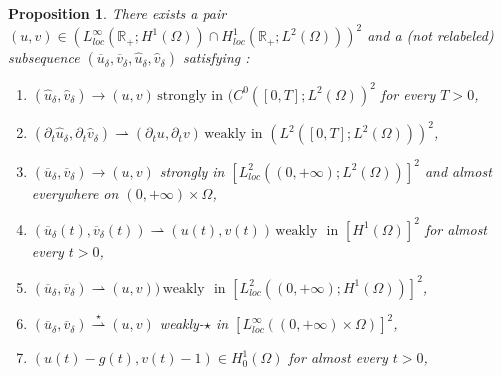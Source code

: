 \documentclass[reqno,12pt,twoside]{amsart}
\newtheorem{proposition}{Proposition}[section]
\numberwithin{equation}{section} \numberwithin{theorem}{section}
\numberwithin{proposition}{section} \numberwithin{lemma}{section}
\numberwithin{corollary}{section}
\numberwithin{definition}{section} \numberwithin{remark}{section}
\begin{document}
\begin{proposition}\label{extraction}
There exists a pair $(u,v) \in \left(L_{loc}^\infty(\mathbb{R}_+; H^1(\Omega)) \cap H_{loc}^1(\mathbb{R}_+; L^2(\Omega))\right)^2$ and a (not relabeled) subsequence $(\overline{u}_\delta, \overline{v}_\delta, \hat{u}_\delta, \hat{v}_\delta)$ satisfying :  

\begin{enumerate}
\item $(\hat{u}_\delta , \hat{v}_\delta) \rightarrow (u,v) \, \text{strongly} \text{ in } (C^0([0,T];L^2(\Omega))^2$ for every $T >0$,

\item $(\partial_t \hat{u}_\delta , \partial_t \hat{v}_\delta) \rightharpoonup (\partial_t u,\partial_t v) \, \text{weakly} \text{ in } (L^2([0,T]; L^2(\Omega)))^2$,

\item $(\overline{u}_\delta, \overline{v}_\delta) \longrightarrow (u,v)$ strongly in $[L^2_{loc}((0,+\infty); L^2(\Omega))]^2$ and almost everywhere on $(0,+\infty)\times \Omega$,

\item $(\overline{u}_\delta (t), \overline{v}_\delta(t)) \rightharpoonup (u(t),v(t)) \, \text{weakly } \text{ in } [H^1(\Omega)]^2$ for almost every  $t >0$, 

\item $(\overline{u}_\delta , \overline{v}_\delta ) \rightharpoonup (u,v)) \, \text{weakly } \text{ in } [L^2_{loc}((0, +\infty) ;H^1(\Omega))]^2$, 

\item $(\overline{u}_\delta, \overline{v}_\delta) \overset{\star}{\rightharpoonup} (u, v)$ weakly-$\star$ in $[L^\infty_{loc}((0,+\infty) \times \Omega)]^2$,

\item $(u(t) - g(t), v(t) - 1) \in H_0^1 (\Omega)$ for almost every $t >0$,  
\end{enumerate}
\end{proposition}
\end{document}
